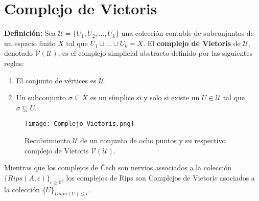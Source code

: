 \documentclass{article}
\begin{document}
\section{Complejo de Vietoris}
\textbf{Definición:} Sea $\mathcal{U}=\{U_{1}, U_{2}, ... ,U_{k}\}$ una colección contable de subconjuntos de un espacio finito $X$ tal que $U_{1}\cup ... \cup U_{k}=X$. El \textbf{complejo de Vietoris} de $\mathcal{U}$, denotado \textbf{$\mathcal{V}(\mathcal{U})$}, es el complejo simplicial abstracto definido por las siguientes reglas:
\begin{enumerate}
    \item El conjunto de vértices es $\mathcal{U}$.
    \item Un subconjunto $\sigma \subseteq X$ es un símplice si y solo si existe un $U \in \mathcal{U}$ tal que $\sigma \subseteq U$.
\end{enumerate}
\begin{figure}[h]
  \centering
  \texttt{[image: Complejo\_Vietoris.png]}
  \caption{Recubrimiento $\mathcal{U}$ de un conjunto de ocho puntos y su respectivo complejo de Vietoris $\mathcal{V}(\mathcal{U})$.}
  \label{fig:mi_imagen}
\end{figure}
Mientras que los complejos de Čech son nervios associados a la colección $\{Rips(A,\epsilon)\}_{\epsilon \geq 0}$, los complejos de Rips son Complejos de Vietoris asociados a la colección $\{U\}_{Diam(U)\leq \epsilon}$.
\end{document}
